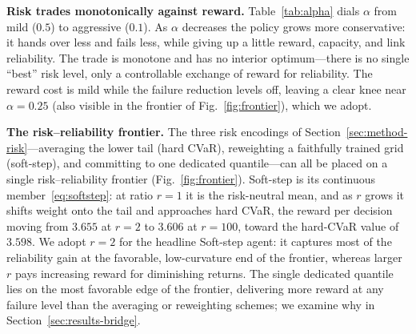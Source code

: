 \documentclass[conference]{IEEEtran}
\begin{document}
\textbf{Risk trades monotonically against reward.} Table~\ref{tab:alpha} dials
$\alpha$ from mild ($0.5$) to aggressive ($0.1$). As $\alpha$ decreases the policy
grows more conservative: it hands over less and fails less, while giving up a
little reward, capacity, and link reliability. The trade is monotone and has no
interior optimum---there is no single ``best'' risk level, only a controllable
exchange of reward for reliability. The reward cost is mild while the failure
reduction levels off, leaving a clear knee near $\alpha=0.25$ (also visible in the
frontier of Fig.~\ref{fig:frontier}), which we adopt.

\textbf{The risk--reliability frontier.} The three risk encodings of
Section~\ref{sec:method-risk}---averaging the lower tail (hard CVaR), reweighting a
faithfully trained grid (soft-step), and committing to one dedicated
quantile---can all be placed on a single risk--reliability frontier
(Fig.~\ref{fig:frontier}). Soft-step is its continuous member~\eqref{eq:softstep}: at ratio $r=1$ it is
the risk-neutral mean, and as $r$ grows it shifts weight onto the tail and
approaches hard CVaR, the reward per decision moving from $3.655$ at $r=2$ to
$3.606$ at $r=100$, toward the hard-CVaR value of $3.598$.
We adopt $r=2$ for the headline Soft-step agent: it captures most of the reliability gain at
the favorable, low-curvature end of the frontier, whereas larger $r$ pays
increasing reward for diminishing returns.
The single dedicated
quantile lies on the most favorable edge of the frontier, delivering more reward at
any failure level than the averaging or reweighting schemes; we examine why in
Section~\ref{sec:results-bridge}.
\end{document}
